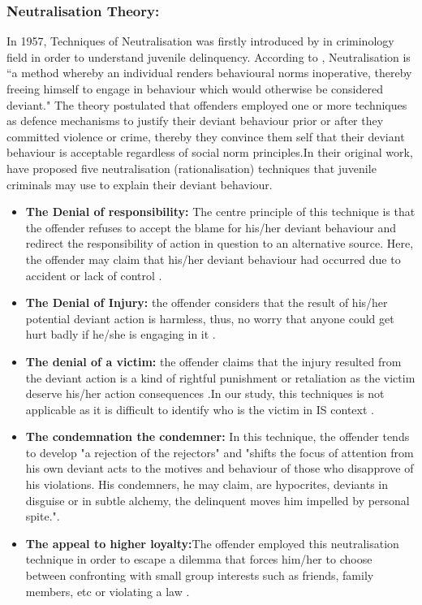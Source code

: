 \subsubsection{Neutralisation Theory:}
In 1957, Techniques of Neutralisation was firstly introduced by \citet{Sykes1957} in criminology field in order to understand juvenile delinquency. According to \cite{Rogers1974}, Neutralisation is “a method whereby an individual renders behavioural norms inoperative, thereby freeing himself to engage in behaviour which would otherwise be considered deviant." The theory postulated that offenders employed one or more techniques as defence mechanisms to justify their deviant behaviour prior or after they committed violence or crime, thereby they convince them self that their deviant behaviour is acceptable regardless of social norm principles\cite{Teh2015}.In their original work, \citet{Sykes1957}have proposed five neutralisation (rationalisation) techniques that juvenile criminals may use to explain their deviant behaviour.
\begin{itemize}
\item \textbf{The Denial of responsibility:} The centre principle of this technique is that the offender refuses to accept the blame for his/her deviant behaviour and redirect the responsibility of action in question to an alternative source. Here, the offender may claim that his/her deviant behaviour had occurred due to accident or lack of control \cite{Sykes1957}.   
\item \textbf{The Denial of Injury:} the offender considers that the result of his/her potential deviant action is harmless, thus, no worry that anyone could get hurt badly if he/she is engaging in it \cite{Sykes1957}. 
\item \textbf{The denial of a victim:} the offender claims that the injury resulted from the deviant action is a kind of rightful punishment or retaliation as the victim deserve his/her action consequences \cite{Sykes1957}.In our study, this techniques is not applicable as it is difficult to identify who is the victim in IS context \citet{Siponen2010}.
\item \textbf{The condemnation the condemner:} In this technique, the offender tends to develop "a rejection of the rejectors" and "shifts the focus of attention from his own deviant acts to the motives and behaviour of those who disapprove of his violations. His condemners, he may claim, are hypocrites, deviants in disguise or in subtle alchemy, the delinquent moves him impelled by personal spite."\cite{Sykes1957}.
\item \textbf{The appeal to higher loyalty:}The offender employed this neutralisation technique in order to escape a dilemma that forces him/her to choose between confronting with small group interests such as friends, family members, etc or violating a law \cite{Sykes1957}.    
\end{itemize}
